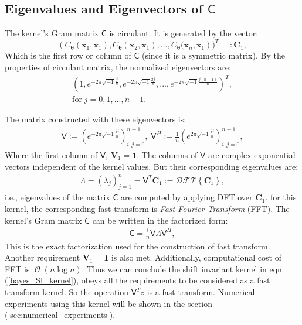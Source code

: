 \documentclass[twocolumn]{svjour3}          %
\DeclareMathOperator{\Order}{{\mathcal O}}
\newcommand{\bm}[1]{\boldsymbol{#1}}
\newcommand{\vtheta}{{\bm{\theta}}}
\newcommand{\vC}{\bm{C}}
\newcommand{\vV}{\bm{V}}
\newcommand{\vx}{\bm{x}}
\newcommand{\vCvtheta}{{C_\vtheta}}
\newcommand{\vone}{\bm{1}}
\newcommand{\mC}{\mathsf{C}}
\newcommand{\mLambda}{\mathsf{\Lambda}}
\newcommand{\mV}{\mathsf{V}}
\begin{document}
\subsection{Eigenvalues and Eigenvectors of $\mC$}

The kernel's Gram matrix $\mC$ is circulant. It is generated by the vector:
\begin{equation}
\label{eqn_top_row_of_kernel_matrix}
\left( \vCvtheta(\vx_1,\vx_1),\vCvtheta(\vx_2,\vx_1),...,\vCvtheta(\vx_{n},\vx_1 \right) 
)^T =: \vC_1,
\end{equation}
Which is the first row or column of $\mC$ (since it is a symmetric matrix).  By the properties of circulant matrix, the normalized eigenvectors are:
\begin{multline*}
\left(
1, 
e^{- 2 \pi \sqrt{-1} \frac{j}{n}},
e^{- 2 \pi \sqrt{-1} \frac{2j}{n}}
,...,
e^{- 2 \pi \sqrt{-1} \frac{j(n-1)}{n}}  
\right)^T, \\ \text{for} \;
j=0,1,...,n-1 .
\end{multline*}

The matrix constructed with these eigenvectors is: 
\begin{align*}
\mV  := \left(e^{- 2 \pi \sqrt{-1} \frac{i j}{n}} \right)_{i,j=0}^{n-1},\;
\mV^H := \frac{1}{n} \left(e^{ 2 \pi \sqrt{-1} \frac{i j}{n}} \right)_{i,j=0}^{n-1},
\end{align*}
Where the first column of $\mV$, $\vV_1 = \vone$.
The columns of $\mV$ are complex exponential vectors independent of the kernel values. But their corresponding eigenvalues are:
\begin{align*}
\mLambda = \left( \lambda_j \right)_{j=1}^{n} = \mV^T \vC_1 := \mathcal{DFT} \left\lbrace \vC_1 \right\rbrace,
\end{align*}
i.e., eigenvalues of the matrix $\mC$ are computed by applying DFT over $\vC_1$. 
for this kernel, the corresponding fast transform is \emph{Fast Fourier Transform} (FFT). 
The kernel's Gram matrix $\mC$ can be written in the factorized form:
\begin{align*}
\mC = \frac1n \mV \mLambda \mV^H,
\end{align*}
This is the exact factorization used for the construction of fast transform. 
Another requirement $\vV_1 = \vone$ is also met.
Additionally, computational cost of FFT is $\Order(n \log n)$.
Thus we can conclude the shift invariant kernel in eqn (\ref{bayes_SI_kernel}), obeys all the requirements to be considered as a {fast transform kernel}. So the operation $\mV^T z$ is a fast transform.
Numerical experiments using this kernel will be shown in the section (\ref{sec:numerical_experiments}).
\end{document}
